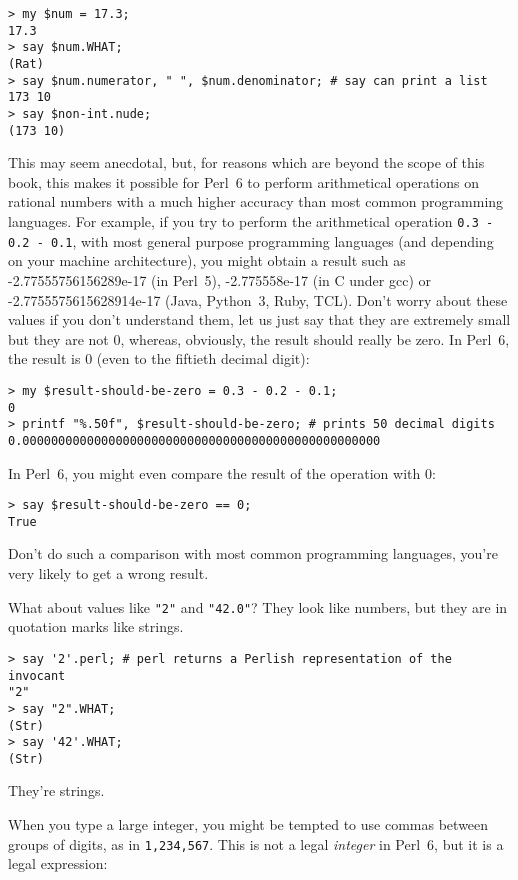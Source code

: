 \begin{verbatim}
> my $num = 17.3;
17.3
> say $num.WHAT;
(Rat)
> say $num.numerator, " ", $num.denominator; # say can print a list
173 10
> say $non-int.nude;
(173 10) 
\end{verbatim}
%
This may seem anecdotal, but, for reasons which are 
beyond the scope of this book, this makes it possible for Perl~6 
to perform arithmetical operations on rational numbers with 
a much higher accuracy than most common programming languages. 
For example, if you try to perform the arithmetical operation
\verb'0.3 - 0.2 - 0.1', with most general purpose programming languages 
(and depending on your machine architecture), you 
might obtain a result such as -2.77555756156289e-17 (in Perl~5), 
-2.775558e-17 (in C under gcc) or -2.7755575615628914e-17 
(Java, Python~3, Ruby, TCL). Don't worry about these values if you 
don't understand them, let us just say that they  are 
extremely small but they are not 0, whereas,  
obviously, the result should really be zero. In Perl~6, 
the result is 0 (even to the fiftieth decimal digit):
\begin{verbatim}
> my $result-should-be-zero = 0.3 - 0.2 - 0.1;
0
> printf "%.50f", $result-should-be-zero; # prints 50 decimal digits
0.00000000000000000000000000000000000000000000000000
\end{verbatim}
%
In Perl~6, you might even compare the result of the operation with 0:
\begin{verbatim}
> say $result-should-be-zero == 0;
True
\end{verbatim}
%
Don't do such a comparison with most common programming 
languages, you're very likely to get a wrong result.

What about values like \verb'"2"' and \verb'"42.0"'?
They look like numbers, but they are in quotation marks like
strings.

\begin{verbatim}
> say '2'.perl; # perl returns a Perlish representation of the invocant
"2"
> say "2".WHAT;
(Str)
> say '42'.WHAT;
(Str)
\end{verbatim}
%
They're strings.

When you type a large integer, you might be tempted to use commas
between groups of digits, as in {\tt 1,234,567}.  This is not a
legal {\em integer} in Perl~6, but it is a legal expression:

